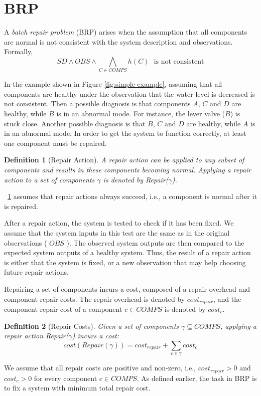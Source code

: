 \documentclass[a4paper,11pt]{report}
\newtheorem{definition}{Definition}
\newcommand{\cost}{\textit{cost}}
\newcommand{\COMPS}{\textit{COMPS}}
\newcommand{\SD}{\textit{SD}}
\newcommand{\OBS}{\textit{OBS}}
\begin{document}
\section{BRP}

A {\em batch repair problem} (BRP) arises when the assumption that all components are normal is not consistent with the system description and observations. Formally,
\[ \SD \wedge \OBS \wedge \bigwedge_{C\in \COMPS} h(C) ~~~ \text{is not consistent} \]

In the example shown in Figure \ref{fig:simple-example}, assuming that all components are healthy under the observation that the water level is decreased is not consistent. Then a possible diagnosis is that components $A$, $C$ and $D$ are healthy, while $B$ is in an abnormal mode. For instance, the lever valve ($B$) is stuck close. Another possible diagnosis is that $B$, $C$ and $D$ are healthy, while $A$ is in an abnormal mode. In order to get the system to function correctly, at least one component must be repaired.

\begin{definition}[Repair Action]
A repair action can be applied to any subset of components and results in these components becoming normal. Applying a repair action to a set of components $\gamma$ is denoted by Repair($\gamma$).
\label{def:repairAction}
\end{definition}
\noindent ~\ref{def:repairAction} assumes that repair actions always succeed, i.e., a component is normal after it is repaired. 

After a repair action, the system is tested to check if it has been fixed.
We assume that the system inputs in this test are the same as in the original observations ( $\OBS$ ). The observed system outputs are then compared to the expected system outputs of a healthy system. Thus, the result of a repair action is either that the system is fixed, or a new observation that may help choosing future repair actions.

Repairing a set of components incurs a cost, composed of a repair overhead and component repair costs. The repair overhead is denoted by $\cost_{repair}$, and the component repair cost of a component $c\in \COMPS$ is denoted by $\cost_{c}$.

\begin{definition}[Repair Costs]
Given a set of components $\gamma\subseteq \COMPS$, applying a repair action Repair($\gamma$) incurs a cost:
\[ \cost(Repair(\gamma)) = \cost_{repair} + \sum_{c\in \gamma} \cost_{c} \]
\end{definition}
We assume that all repair costs are positive and non-zero, i.e., $\cost_{repair}>0$ and $\cost_{c}>0$ for every component $c \in \COMPS$. As defined earlier, the task in BRP is to fix a system with minimum total repair cost.
\end{document}
